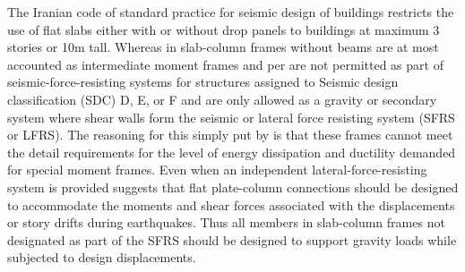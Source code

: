 The Iranian code of standard practice for seismic design of buildings\citep[Section 3-3-5-5]{28002014} restricts the use of flat slabs either with or without drop panels to buildings at maximum 3 stories or 10m tall. Whereas in \cite{aci31819} slab-column frames without beams are at most accounted as intermediate moment frames and per \citet[Section R18.2]{aci31819} are not permitted as part of seismic-force-resisting systems for structures assigned to Seismic design classification (SDC) D, E, or F and are only allowed as a gravity or secondary system where shear walls form the seismic or lateral force resisting system (SFRS or LFRS). The reasoning for this simply put by \citet[Chapter 7]{JointACI-ASCECommittee4212015} is that these frames cannot meet the detail requirements for the level of energy dissipation and ductility demanded for special moment frames. Even when an independent lateral-force-resisting system is provided \cite{JointACI-ASCECommittee4212015} suggests that flat plate-column connections should be designed to accommodate the moments and shear forces associated with the displacements or story drifts during earthquakes. Thus all members in slab-column frames not designated as part of the SFRS should be designed to support gravity loads while subjected to design displacements.  

